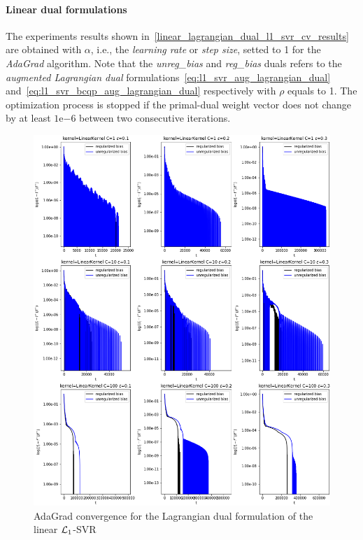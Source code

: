 \pagebreak

\paragraph{Linear dual formulations}

The experiments results shown in~\ref{linear_lagrangian_dual_l1_svr_cv_results} are obtained with $\alpha$, i.e., the \emph{learning rate} or \emph{step size}, setted to 1 for the \emph{AdaGrad} algorithm. Note that the \emph{unreg\_bias} and \emph{reg\_bias} duals refers to the \emph{augmented Lagrangian dual} formulations~\eqref{eq:l1_svr_aug_lagrangian_dual} and~\eqref{eq:l1_svr_bcqp_aug_lagrangian_dual} respectively with $\rho$ equals to 1. The optimization process is stopped if the primal-dual weight vector does not change by at least $1\mathrm{e}{-6}$  between two consecutive iterations.





\begin{figure}[H]
	\centering
	\includegraphics[scale=0.55]{img/linear_lagrangian_dual_l1_svr_loss_history}
	\caption{AdaGrad convergence for the Lagrangian dual formulation of the linear $\protect \mathcal{L}_1$-SVR}
	\label{fig:linear_lagrangian_dual_l1_svr_loss_history}
\end{figure}

